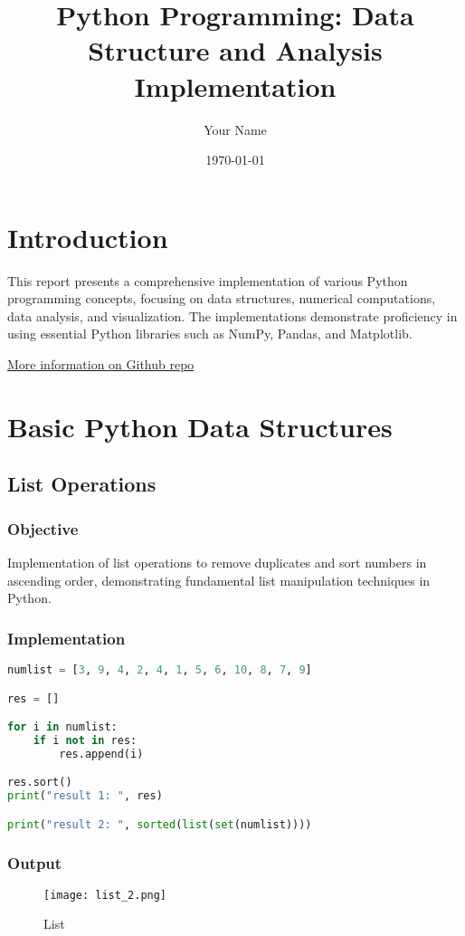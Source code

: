 \documentclass[12pt]{article}
\title{Python Programming: Data Structure and Analysis Implementation}
\author{Your Name}
\date{\today}
\begin{document}
 
  
\newpage

\section{Introduction}
This report presents a comprehensive implementation of various Python programming concepts, focusing on data structures, numerical computations, data analysis, and visualization. The implementations demonstrate proficiency in using essential Python libraries such as NumPy, Pandas, and Matplotlib.

\vspace{1em}
\noindent
\href{https://github.com/sabbirahmed404/Python-Practice}{More information on Github repo} 

\section{Basic Python Data Structures}

\subsection{List Operations\hfill\href{https://github.com/sabbirahmed404/Python-Practice/blob/main/list.py}{\faGithub}}
\subsubsection{Objective}
Implementation of list operations to remove duplicates and sort numbers in ascending order, demonstrating fundamental list manipulation techniques in Python.

\subsubsection{Implementation}
\begin{lstlisting}[language=Python, caption=List Operations Implementation]
numlist = [3, 9, 4, 2, 4, 1, 5, 6, 10, 8, 7, 9]

res = []

for i in numlist:
    if i not in res:
        res.append(i)

res.sort()
print("result 1: ", res)

print("result 2: ", sorted(list(set(numlist))))
\end{lstlisting}
\newpage

\subsubsection{Output}
\begin{figure}[!h]
    \centering
    \texttt{[image: list\_2.png]}
    \caption{List}
    \label{fig:enter-label}
\end{figure}
\end{document}
